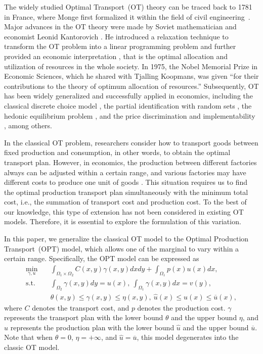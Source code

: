 \documentclass[review,hidelinks,onefignum,onetabnum]{siamart220329}
\begin{document}
The widely studied Optimal Transport~(OT) theory can be traced back to 1781 in France, where Monge first formalized it within the field of civil engineering~\cite{monge1781}. 
Major advances in the OT theory were made by Soviet mathematician and economist Leonid Kantorovich \cite{kantorovich1942,villani2003topics}. 
He introduced a relaxation technique to transform the OT problem into a linear programming problem and further provided an economic interpretation \cite{OTinEconomic}, that is the optimal allocation and utilization of resources in the whole society. 
In 1975, the Nobel Memorial Prize in Economic Sciences, which he shared with Tjalling Koopmans, was given ``for their contributions to the theory of optimum allocation of resources.'' 
Subsequently, OT has been widely generalized and successfully applied in economics, 
including the classical discrete choice model \cite{chiong2016duality,galichon2022cupid},
the partial identification with random sets \cite{galichon2021inference,galichon2011set}, 
the hedonic equilibrium problem \cite{ekeland2004identification,matzkin2003nonparametric},  and the price discrimination and implementability \cite{laffont1988fundamentals}, among others.


In the classical OT problem, researchers consider how to transport goods between fixed production and consumption, in other words, to obtain the optimal transport plan. 
However, in economics, the production between different factories always can be adjusted within a certain range, and various factories may have different costs to produce one unit of goods \cite{kasilingam1998logistics,stock2001strategic,mangan2016global}. 
This situation requires us to find the optimal production transport plan simultaneously with the minimum total cost, i.e., the summation of transport cost and production cost. To the best of our knowledge, this type of extension has not been considered in existing OT models. 
Therefore, it is essential to explore the formulation of this variation. 

In this paper, we generalize the classical OT model to the Optimal Production Transport~(OPT) model, which allows one of the marginal to vary within a certain range. 
Specifically, the OPT model can be expressed as 
\begin{equation}
\label{OPTC}
\begin{aligned}
 		\min_{\gamma, u} & \quad \int_{\Omega_1 \times \Omega_2} C(x,y)\gamma(x,y)dx dy +\int_{\Omega_1}p(x) u(x) dx,\\
\mathrm{s.t.} &  \quad \int_{\Omega_2}\gamma(x,y) d y=u(x), \ \int_{\Omega_1}\gamma(x,y) d x=v(y), \\
		& \quad  \theta(x,y) \leq \gamma(x,y)\leq \eta(x,y), \ \hat{u}(x)\leq u(x) \leq \overline{u}(x),  
\end{aligned}
\end{equation}
where $C$ denotes the transport cost, and $p$ denotes the production cost. $\gamma$ represents the transport plan with the lower bound $\theta$ and the upper bound $\eta$, and $u$ represents the production plan with the lower bound $\hat{u}$ and the upper bound $\overline{u}$. 
Note that when $\theta=0$, $\eta=+\infty$, and $\hat{u}=\overline{u}$, this model degenerates into the classic OT model.
 
\end{document}
